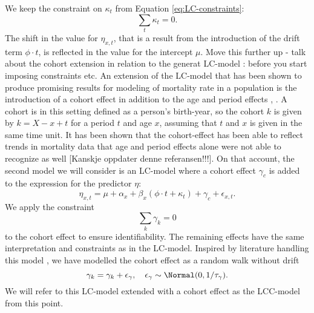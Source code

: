 We keep the constraint on $\kappa_t$ from Equation \ref{eq:LC-constraints}:
\begin{equation*}
    \sum_t \kappa_t = 0.
\end{equation*}
The shift in the value for $\eta_{x,t}$, that is a result from the introduction of the drift term $\phi \cdot t$, is reflected in the value for the intercept $\mu$. 
\newline
\textcolor{myDarkGreen}{Move this further up - talk about the cohort extension in relation to the generat LC-model : before you start imposing constraints etc. }
An extension of the LC-model that has been shown to produce promising results for modeling of mortality rate in a population is the introduction of a cohort effect in addition to the age and period effects \cite{booth_tickle_2008}, \cite{Wisniowski2015}. A cohort is in this setting defined as a person's birth-year, so the cohort $k$ is given by $k = X - x + t$ for a period $t$ and age $x$, assuming that $t$ and $x$ is given in the same time unit. It has been shown that the cohort-effect has been able to reflect trends in mortality data that age and period effects alone were not able to recognize as well \cite{Wisniowski2015}[Kanskje oppdater denne referansen!!!]. On that account, the second model we will consider is an LC-model where a cohort effect $\gamma_c$ is added to the expression for the predictor $\eta$:
\begin{equation}
    \eta_{x,t} = \mu + \alpha_x + \beta_x(\phi \cdot t + \kappa_t) + \gamma_c + \epsilon_{x,t}.
    \label{eq:LCC-model}
\end{equation}
We apply the constraint 
\begin{equation}
    \sum_k \gamma_k = 0
    \label{eq:cohort-constraint}
\end{equation}
to the cohort effect to ensure identifiability. The remaining effects have the same interpretation and constraints as in the LC-model. Inspired by literature handling this model \cite{Wisniowski2015}, we have modelled the cohort effect as a random walk without drift
\begin{equation}
    \gamma_k = \gamma_k + \epsilon_\gamma, \quad \epsilon_\gamma \sim \Normal(0, 1/\tau_\gamma).
    \label{eq:cohort-rw}
\end{equation}
We will refer to this LC-model extended with a cohort effect as the LCC-model from this point.
